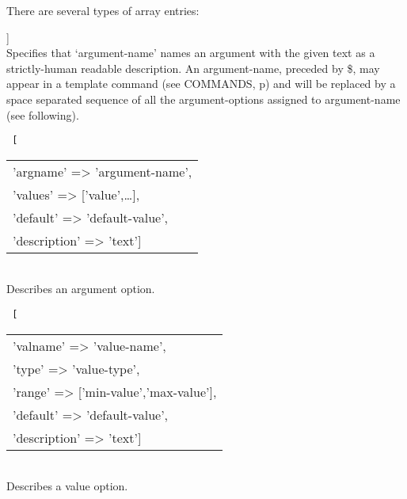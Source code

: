 \documentclass[12pt]{article}
\newenvironment{indpar}[1][0.4in]%
	{\begin{list}{}%
		     {\setlength{\itemsep}{0in}%
		      \setlength{\topsep}{0in}%
		      \setlength{\parsep}{1ex}%
		      \setlength{\labelwidth}{#1}%
		      \setlength{\leftmargin}{#1}%
		      \addtolength{\leftmargin}{\labelsep}}%
	 \item}%
	{\end{list}}
\newenvironment{itemlist}[1][0.2in]%
	{\begin{list}{}{\setlength{\labelwidth}{#1}%
		        \setlength{\leftmargin}{\labelwidth}%
		        \addtolength{\leftmargin}{+0.2in}%
		        \addtolength{\linewidth}{-\labelwidth}%
		        \addtolength{\linewidth}{-0.2in}%
		        \renewcommand{\makelabel}[1]{##1\hfill}}
	 \raggedright}%
	{\end{list}}
\newcommand{\pagref}[1]{p\pageref{#1}}
\begin{document}
\begin{indpar}
There are several types of array entries:
\begin{itemlist}

\item[\tt 'argument-name' => ['description' => 'text']] ~ \\
Specifies that `argument-name' names an argument with the
given text as a strictly-human readable description.
An argument-name, preceded by \$, may appear in a template
command (see COMMANDS, \pagref{TEMPLATE-COMMANDS}) and will be replaced
by a space separated sequence of all the argument-options assigned to
argument-name (see following).

\medskip

\newsavebox{\argoptbox}
\begin{lrbox}{\argoptbox}
\tt
[\begin{tabular}[t]{l}
'argname' => 'argument-name', \\
'values' => ['value',\ldots], \\
'default' => 'default-value', \\
'description' => 'text'] \\
\end{tabular}
\end{lrbox}
\item[\tt 'option-name' => \usebox{\argoptbox}] ~ \\
Describes an argument option.

\medskip

\newsavebox{\valoptbox}
\begin{lrbox}{\valoptbox}
\tt
[\begin{tabular}[t]{l}
'valname' => 'value-name', \\
'type' => 'value-type', \\
'range' => ['min-value','max-value'], \\
'default' => 'default-value', \\
'description' => 'text'] \\
\end{tabular}
\end{lrbox}
\item[\tt 'option-name' => \usebox{\valoptbox}] ~ \\
Describes a value option.

\end{itemlist}
\end{indpar}
\end{document}
